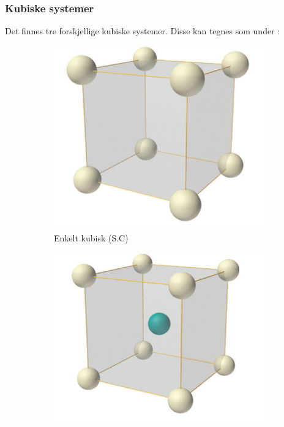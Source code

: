 \documentclass{article}
\begin{document}
\subsubsection{Kubiske systemer}
Det finnes tre forskjellige kubiske systemer. Disse kan tegnes som under \cite{kubiske_systemer}:
\begin{figure}[H]
  \centering
  \begin{subfigure}{0.3\textwidth}
    \includegraphics[width=\linewidth]{bilder/enkelt_kubisk.png}
    \caption{Enkelt kubisk (S.C)}
    \label{fig:enkelt_kubisk}
  \end{subfigure}
  \begin{subfigure}{0.3\textwidth}
    \includegraphics[width=\linewidth]{bilder/romsentert_kubisk.png}

\end{subfigure}
\end{figure}
\end{document}
